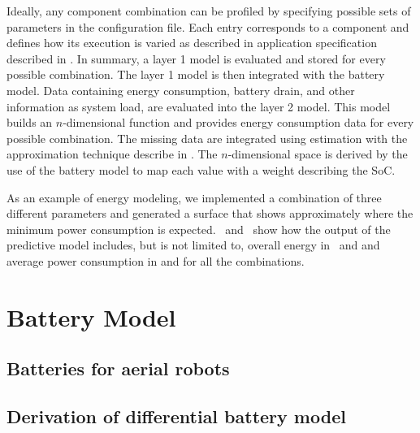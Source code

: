Ideally, any component combination can be profiled by specifying possible sets of parameters in the configuration file. Each entry corresponds to a component and defines how its execution is varied as described in application specification described in . In summary, a layer 1 model is evaluated and stored for every possible combination. The layer 1 model is then integrated with the battery model. Data containing energy consumption, battery drain, and other information as system load, are evaluated into the layer 2 model. This model builds an $n$-dimensional function and provides energy consumption data for every possible combination. The missing data are integrated using estimation with the approximation technique describe in . The $n$-dimensional space is derived by the use of the battery model to map each value with a weight describing the SoC.

As an example of energy modeling, we implemented a combination of three different parameters and generated a surface that shows approximately where the minimum power consumption is expected. ~and~ show how the output of the predictive model includes, but is not limited to, overall energy in~ and  and average power consumption in  and  for all the combinations. 

\section{\color{red}Battery Model}
\label{sec:battery-model}


\subsection{\color{orange}Batteries for aerial robots}

\subsection{\color{cyan}Derivation of differential battery model}

